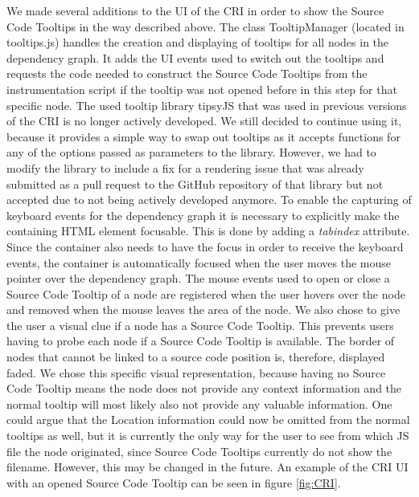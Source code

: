 We made several additions to the UI of the CRI in order to show the Source Code Tooltips in the way described above. The class TooltipManager (located in tooltips.js) handles the creation and displaying of tooltips for all nodes in the dependency graph. It adds the UI events used to switch out the tooltips and requests the code needed to construct the Source Code Tooltips from the instrumentation script if the tooltip was not opened before in this step for that specific node. The used tooltip library tipsyJS \cite{Tipsy} that was used in previous versions of the CRI is no longer actively developed. We still decided to continue using it, because it provides a simple way to swap out tooltips as it accepts functions for any of the options passed as parameters to the library. However, we had to modify the library to include a fix for a rendering issue that was already submitted as a pull request to the GitHub repository of that library but not accepted due to not being actively developed anymore. To enable the capturing of keyboard events for the dependency graph it is necessary to explicitly make the containing HTML element focusable. This is done by adding a \emph{tabindex} attribute. Since the container also needs to have the focus in order to receive the keyboard events, the container is automatically focused when the user moves the mouse pointer over the dependency graph. The mouse events used to open or close a Source Code Tooltip of a node are registered when the user hovers over the node and removed when the mouse leaves the area of the node. We also chose to give the user a visual clue if a node has a Source Code Tooltip. This prevents users having to probe each node if a Source Code Tooltip is available. The border of nodes that cannot be linked to a source code position is, therefore, displayed faded. We chose this specific visual representation, because having no Source Code Tooltip means the node does not provide any context information and the normal tooltip will most likely also not provide any valuable information. One could argue that the Location information could now be omitted from the normal tooltips as well, but it is currently the only way for the user to see from which JS file the node originated, since Source Code Tooltips currently do not show the filename. However, this may be changed in the future. An example of the CRI UI with an opened Source Code Tooltip can be seen in figure \ref{fig:CRI}.
	
